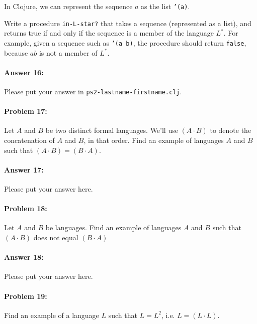 \documentclass[10pt]{article}
\newcommand{\PSnum}{2}
\begin{document}
In Clojure, we can represent the sequence $a$ as the list \texttt{'(a)}.

Write a procedure \texttt{in-L-star?} that takes a sequence
(represented as a list), and returns true if and only if the sequence is a member
of the language $L^*$.
For example, given a sequence such as \texttt{'(a b)}, the procedure should return
\texttt{false}, because $ab$ is not a member of $L^*$.

\paragraph{Answer 16:} Please put your answer in
\texttt{ps\PSnum-lastname-firstname.clj}.

\noindent\hrulefill %

\paragraph{Problem 17:}
Let $A$ and $B$ be two distinct formal languages. We'll use
$(A\cdot B)$ to denote the concatenation of $A$ and $B$, in
that order. Find an example of languages $A$ and $B$ such that
$(A\cdot B)=(B\cdot A)$.

\paragraph{Answer 17:} Please put your answer here.

\noindent\hrulefill %

\paragraph{Problem 18:}
Let $A$ and $B$ be languages. Find an example of languages $A$ and $B$
such that $(A\cdot B)$ does not equal $(B\cdot A)$

\paragraph{Answer 18:} Please put your answer here.

\noindent\hrulefill %

\paragraph{Problem 19:}
Find an example of a language $L$ such that $L=L^2$,
i.e. $L=(L\cdot L)$.
\end{document}
